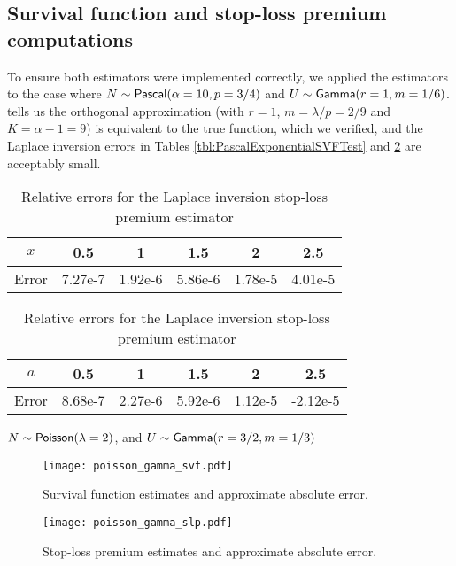 \subsection{Survival function and stop-loss premium computations}

\label{subsec:NumericsSurvivalFunctionStopLoss}

To ensure both estimators were implemented correctly, we applied the estimators to the case where $N\sim\mathsf{Pascal}(\alpha=10,p=3/4)$ and $U\sim\mathsf{Gamma}(r=1,m=1/6)$.  tells us the orthogonal approximation (with $r=1$, $m=\lambda/p=2/9$ and $K = \alpha-1 = 9$) is equivalent to the true function, which we verified, and the Laplace inversion errors in Tables \ref{tbl:PascalExponentialSVFTest} and \ref{tbl:PascalExponentialSLPTest} are acceptably small.

\begin{table}[H]
\centering
\caption{Relative errors for the Laplace inversion survival function estimator}
\begin{tabular}{c|ccccc}
$x$                   & 0.5  & 1  & 1.5  & 2 & 2.5  \\
\hline
Error & 7.27e-7 & 1.92e-6 & 5.86e-6 & 1.78e-5 & 4.01e-5 \\
\end{tabular}
\label{tbl:PascalExponentialSVFTest}
\vspace{1em}

\caption{Relative errors for the Laplace inversion stop-loss premium estimator}
\begin{tabular}{c|ccccc}
$a$                   & 0.5  & 1  & 1.5  & 2 & 2.5  \\
\hline
Error & 8.68e-7 & 2.27e-6 & 5.92e-6 & 1.12e-5 & -2.12e-5 \\
\end{tabular}

\label{tbl:PascalExponentialSLPTest}
\end{table}

\begin{test}
$N\sim\mathsf{Poisson}(\lambda=2)$, and $U\sim\mathsf{Gamma}(r=3/2,m=1/3)$
\end{test}

\begin{figure}[H]
\centering
\texttt{[image: poisson\_gamma\_svf.pdf]}
\caption{Survival function estimates and approximate absolute error.}
\end{figure}

\begin{figure}[H]
\centering
\texttt{[image: poisson\_gamma\_slp.pdf]}
\caption{Stop-loss premium estimates and approximate absolute error.}
\end{figure}


